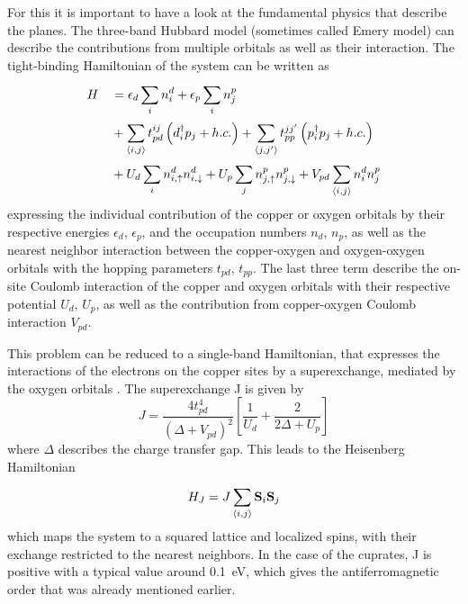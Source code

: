 For this it is important to have a look at the fundamental physics that describe the  planes.
The three-band Hubbard model (sometimes called Emery model) can describe the contributions from multiple orbitals as well as their interaction\cite{avella_emery_2013,emery_theory_1987,ogata_tj_2008}.
The tight-binding Hamiltonian of the system can be written as
\begin{equation}
\begin{split}
	H &\quad = \epsilon_d \sum_{i}^{} n_i^d + \epsilon_p \sum_{i}^{} n_j^p \\
	  &\quad + \sum_{\braket{i,j}}^{} t_{pd}^{ij} \left(d_i^\dagger p_j + h.c.\right) + \sum_{\braket{j,j'}}^{} t_{pp}^{jj'} \left(p_i^\dagger p_j + h.c.\right)\\
	  &\quad + U_d \sum_{i}^{} n_{i,\uparrow}^d n_{i,\downarrow}^d + U_p \sum_{j}^{} n_{j,\uparrow}^p n_{j,\downarrow}^p + V_{pd} \sum_{\braket{i,j}}^{} n_i^d n_j^p
\end{split}
\end{equation}
expressing the individual contribution of the copper or oxygen orbitals by their respective energies $\epsilon_d$, $\epsilon_p$, and the occupation numbers $n_d$, $n_p$, as well as the nearest neighbor interaction between the copper-oxygen and oxygen-oxygen orbitals with the hopping parameters $t_{pd}$, $t_{pp}$.
The last three term describe the on-site Coulomb interaction of the copper and oxygen orbitals with their respective potential $U_d$, $U_p$, as well as the contribution from copper-oxygen Coulomb interaction $V_{pd}$.

This problem can be reduced to a single-band Hamiltonian, that expresses the interactions of the electrons on the copper sites by a superexchange, mediated by the oxygen orbitals \cite{anderson_new_1959,zhang_effective_1988,emery_mechanism_1988}.
The superexchange J is given by
\begin{equation}
	J= \frac{4t_{pd}^4}{\left(\Delta + V_{pd} \right)^2} \left[\frac{1}{U_d} + \frac{2}{2\Delta + U_p}\right]
\end{equation}
where $\Delta$ describes the charge transfer gap.
This leads to the Heisenberg Hamiltonian
\begin{equation}
	H_J = J \sum_{\braket{i,j}}^{} \mathbf{S}_i \mathbf{S}_j
\end{equation}
which maps the system to a squared lattice and localized spins, with their exchange restricted to the nearest neighbors.
In the case of the cuprates, J is positive with a typical value around \qty{0.1}{\electronvolt}, which gives the antiferromagnetic order that was already mentioned earlier.

